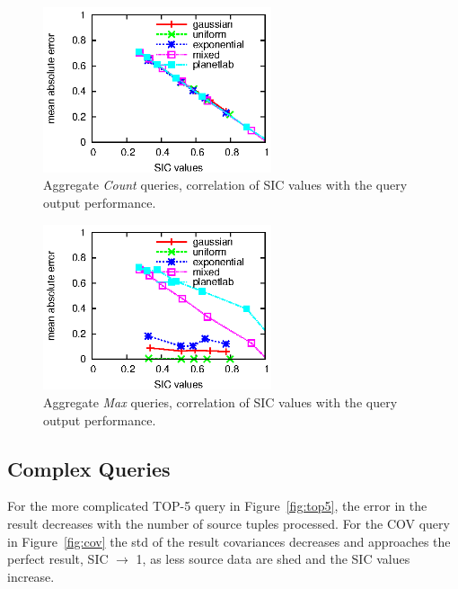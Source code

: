 \begin{figure}[h]
\centering
\includegraphics[width=0.6\textwidth]{img/tesi/count1}
\caption{Aggregate \emph{Count} queries, correlation of SIC values with the query output performance.}
\label{fig:agg-count}
\end{figure}

\begin{figure}[t]
\centering
\label{fig:max}
\includegraphics[width=0.6\textwidth]{img/tesi/max1}
\caption{Aggregate \emph{Max} queries, correlation of SIC values with the query output performance.}
\label{fig:agg-max}
\end{figure}

\clearpage


\subsection{Complex Queries}


For the more complicated \textnormal{TOP-5} query in Figure~\ref{fig:top5}, the 
error in the result decreases with the number of source tuples processed. For the
\textnormal{COV} query in Figure~\ref{fig:cov} the std of the result covariances
decreases and approaches the perfect result, \ie SIC $\rightarrow$ 1, as less source data are shed and the
SIC values increase. 

